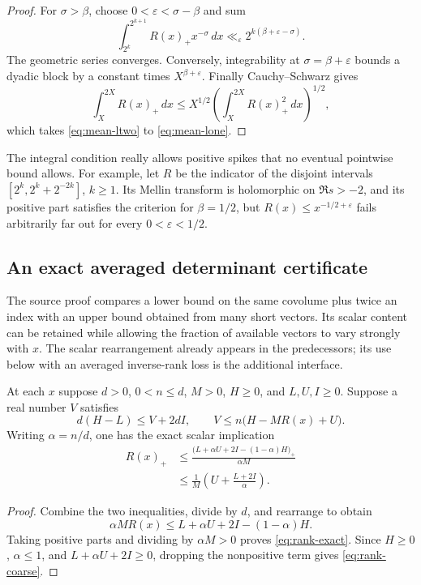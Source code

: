 \begin{proof}
For $\sigma>\beta$, choose $0<\varepsilon<\sigma-\beta$ and sum
\[
 \int_{2^k}^{2^{k+1}} R(x)_+x^{-\sigma}\,dx
 \ll_\varepsilon 2^{k(\beta+\varepsilon-\sigma)}.
\]
The geometric series converges. Conversely, integrability at
$\sigma=\beta+\varepsilon$ bounds a dyadic block by a constant times
$X^{\beta+\varepsilon}$. Finally Cauchy--Schwarz gives
\[
 \int_X^{2X}R(x)_+\,dx
 \le X^{1/2}\left(\int_X^{2X}R(x)_+^2\,dx\right)^{1/2},
\]
which takes \eqref{eq:mean-ltwo} to \eqref{eq:mean-lone}.
\end{proof}

The integral condition really allows positive spikes that no eventual
pointwise bound allows. For example, let $R$ be the indicator of the disjoint
intervals $[2^k,2^k+2^{-2k}]$, $k\ge1$. Its Mellin transform is holomorphic
on $\Re s>-2$, and its positive part satisfies the criterion for
$\beta=1/2$, but $R(x)\le x^{-1/2+\varepsilon}$ fails arbitrarily far out
for every $0<\varepsilon<1/2$.

\subsection{An exact averaged determinant certificate}

The source proof compares a lower bound on the same covolume plus twice an
index with an upper bound obtained from many short vectors. Its scalar
content can be retained while allowing the fraction of available vectors to
vary strongly with $x$.
The scalar rearrangement already appears in the predecessors; its use
below with an averaged inverse-rank loss is the additional interface.

\begin{proposition}\label{prop:rank-loss}
At each $x$ suppose $d>0$, $0<n\le d$, $M>0$, $H\ge0$, and $L,U,I\ge0$.
Suppose a real number $V$ satisfies
\[
 d(H-L)\le V+2dI,
 \qquad
 V\le n\bigl(H-MR(x)+U\bigr).
\]
Writing $\alpha=n/d$, one has the exact scalar implication
\begin{align}
 R(x)_+
 &\le\frac{\bigl(L+\alpha U+2I-(1-\alpha)H\bigr)_+}{\alpha M}
 \label{eq:rank-exact}\\
 &\le\frac{1}{M}\left(U+\frac{L+2I}{\alpha}\right).
 \label{eq:rank-coarse}
\end{align}
\end{proposition}

\begin{proof}
Combine the two inequalities, divide by $d$, and rearrange to obtain
\[
 \alpha M R(x)\le L+\alpha U+2I-(1-\alpha)H.
\]
Taking positive parts and dividing by $\alpha M>0$ proves
\eqref{eq:rank-exact}. Since $H\ge0$, $\alpha\le1$, and
$L+\alpha U+2I\ge0$, dropping the nonpositive term gives
\eqref{eq:rank-coarse}.
\end{proof}

